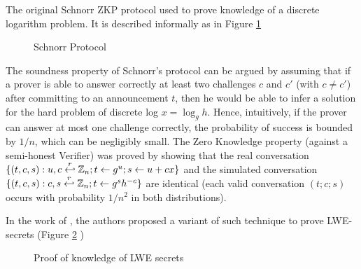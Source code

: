 The original Schnorr ZKP protocol \cite{schnorr1989efficient} used to prove knowledge of a discrete logarithm problem. It is described informally as in Figure \ref{fig:schnorrProtocol}

\begin{figure}[htbp!] 
\centering {}
\caption{Schnorr Protocol}
\label{fig:schnorrProtocol}
\end{figure}

The soundness property of Schnorr's protocol can be argued by assuming that if a prover
is able to answer correctly at least two challenges $c$ and $c'$ (with
$c \neq c'$) after committing to an announcement $t$, then he would be able to infer
a solution for the hard problem of discrete log $x = \log_{g}h$. Hence,
intuitively, if the prover can answer at most one challenge correctly, the
probability of success is bounded by $1/n$, which can be negligibly small. The
Zero Knowledge property (against a semi-honest Verifier) was proved by showing
that the real conversation
$\{(t,c,s): u,c \stackrel{r}{\hookleftarrow} \mathbb{Z}_{n}; t \gets g^{u}; s \gets u + cx\}$
and the simulated conversation
$\{(t,c,s): c, s \stackrel{r}{\hookleftarrow} \mathbb{Z}_{n}; t \gets g^{s}h^{-c}\}$ are
identical (each valid conversation $(t;c;s)$ occurs with probability $1/n^{2}$
in both distributions).

In the work of \cite{benhamouda2014better}, the authors proposed a variant of
such technique to prove LWE-secrets (Figure \ref{fig:benhamoudaProtocol} )
\begin{figure}[htbp!] 
\centering {}
\caption{Proof of knowledge of LWE secrets}
\label{fig:benhamoudaProtocol}
\end{figure}

